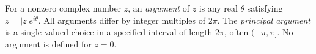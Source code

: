 
For a nonzero complex number $z$, an \emph{argument} of $z$ is any real $\theta$ satisfying $z=|z|e^{i\theta}$. All arguments differ by integer multiples of $2\pi$. The \emph{principal argument} is a single-valued choice in a specified interval of length $2\pi$, often $(-\pi,\pi]$. No argument is defined for $z=0$.
